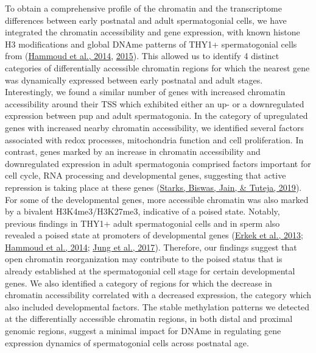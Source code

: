 \documentclass[12pt,twoside]{reedthesis}
\begin{document}
To obtain a comprehensive profile of the chromatin and the transcriptome
differences between early postnatal and adult spermatogonial cells, we
have integrated the chromatin accessibility and gene expression, with
known histone H3 modifications and global DNAme patterns of THY1+
spermatogonial cells from (\protect\hyperlink{ref-hammoud2014}{Hammoud et al., 2014}, \protect\hyperlink{ref-hammoud2015}{2015}). This allowed us
to identify 4 distinct categories of differentially accessible chromatin
regions for which the nearest gene was dynamically expressed between
early postnatal and adult stages. Interestingly, we found a similar
number of genes with increased chromatin accessibility around their TSS
which exhibited either an up- or a downregulated expression between pup
and adult spermatogonia. In the category of upregulated genes with
increased nearby chromatin accessibility, we identified several factors
associated with redox processes, mitochondria function and cell
proliferation. In contrast, genes marked by an increase in chromatin
accessibility and downregulated expression in adult spermatogonia
comprised factors important for cell cycle, RNA processing and
developmental genes, suggesting that active repression is taking place
at these genes (\protect\hyperlink{ref-starks2019}{Starks, Biswas, Jain, \& Tuteja, 2019}). For some of the developmental genes, more
accessible chromatin was also marked by a bivalent H3K4me3/H3K27me3,
indicative of a poised state. Notably, previous findings in THY1+ adult
spermatogonial cells and in sperm also revealed a poised state at
promoters of developmental genes (\protect\hyperlink{ref-erkek2013}{Erkek et al., 2013}; \protect\hyperlink{ref-hammoud2014}{Hammoud et al., 2014}; \protect\hyperlink{ref-jung2017}{Jung et al., 2017}).
Therefore, our findings suggest that open chromatin reorganization may
contribute to the poised status that is already established at the
spermatogonial cell stage for certain developmental genes. We also
identified a category of regions for which the decrease in chromatin
accessibility correlated with a decreased expression, the category which
also included developmental factors. The stable methylation patterns we
detected at the differentially accessible chromatin regions, in both
distal and proximal genomic regions, suggest a minimal impact for DNAme
in regulating gene expression dynamics of spermatogonial cells across
postnatal age.
\end{document}
